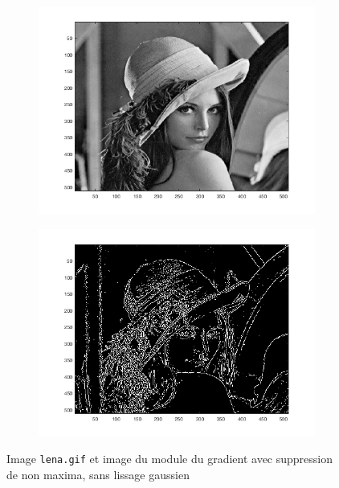 \documentclass[a4paper]{article}
\begin{document}
\begin{figure}[H]
    \centering
    \begin{subfigure}[c]{0.46\textwidth}
        \centering
        \includegraphics[width=\textwidth]{images/lena.png}
    \end{subfigure}
    \begin{subfigure}[c]{0.46\textwidth}
        \centering
        \includegraphics[width=\textwidth]{images/lena_nms.png}
    \end{subfigure}
    \caption{Image \texttt{lena.gif} et image du module du gradient avec
    suppression de non maxima, sans lissage gaussien}
    \label{fig:tools-nms}
\end{figure}
\end{document}
